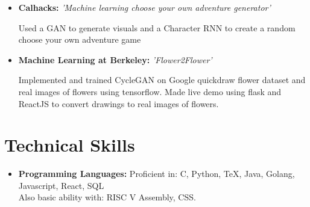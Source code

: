 \documentclass[11pt,letterpaper,sans]{moderncv}        %
\begin{document}
\begin{itemize}

\item{\textbf{Calhacks:} \textit{'Machine learning choose your own adventure generator'}

\vspace{3pt}

\small{Used a GAN to generate visuals and a Character RNN to create a random choose your own adventure game}}
\iffalse
\item{\textbf{Developer Camp Best Education Hack:} \textit{'Splash Game'}

\vspace{3pt}

\small{Used Pixi Library to create a Javascript infinite runner game to teach children about the water cycle and the importance of conservation}}
\fi
\item{\textbf{Machine Learning at Berkeley:} \textit{'Flower2Flower'}

\vspace{3pt}

        \small{Implemented and trained CycleGAN on Google quickdraw flower dataset and real images of flowers using tensorflow. Made live demo using flask and ReactJS to convert drawings to real images of flowers.}}
\end{itemize}

\section{Technical Skills}

\vspace{3pt}

\begin{itemize}

\item \textbf{Programming Languages:} Proficient in: C, Python, TeX, Java, Golang, Javascript, React, SQL \\ Also basic ability with: RISC V Assembly, CSS.

\end{itemize}


\nocite{*}



\end{document}
